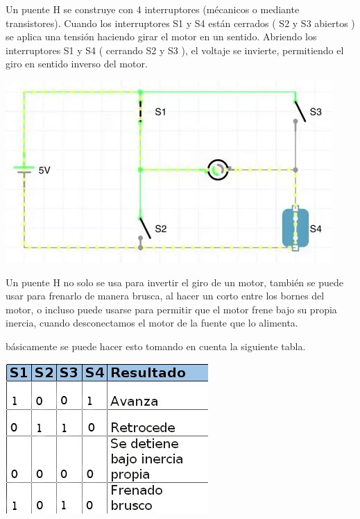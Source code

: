 \documentclass[12pt,a4paper]{article}
\begin{document}
Un puente H se construye con 4 interruptores (mécanicos o mediante transistores). Cuando los interruptores S1 y S4 están cerrados ( S2 y S3 abiertos ) se aplica una tensión haciendo girar el motor en un sentido. Abriendo los interruptores S1 y S4 ( cerrando S2 y S3 ), el voltaje se invierte, permitiendo el giro en sentido inverso del motor.
\begin{center}
\includegraphics[scale=1]{imagenes/gg.jpg}  
\end{center}
\begin{flushleft}
Un puente H no solo se usa para invertir el giro de un motor, también se puede usar para frenarlo de manera brusca, al hacer un corto entre los bornes del motor, o incluso puede usarse para permitir que el motor frene bajo su propia inercia, cuando desconectamos el motor de la fuente que lo alimenta.\linebreak

básicamente se puede hacer esto tomando en cuenta la siguiente tabla.\linebreak
\begin{center}
\includegraphics[scale=0.5]{imagenes/opto.JPG}
\end{center}
\end{flushleft}
\newpage
\end{document}
